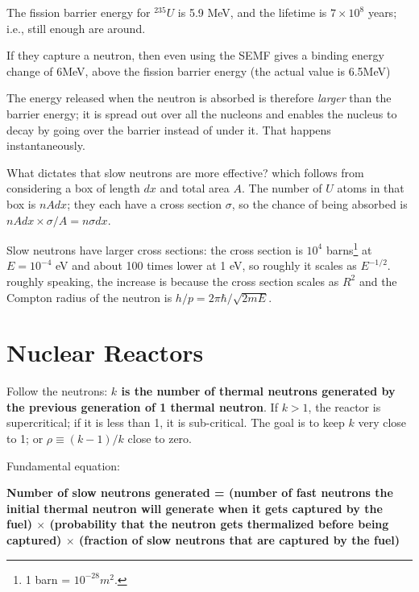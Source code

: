 \documentclass[11pt]{book}
\begin{document}
\bei
\item The fission barrier energy for $^{235}U$ is 5.9 MeV, and the lifetime is $7\times 10^8$ years; i.e., still enough are around.
\item If they capture a neutron, then even using the SEMF gives a binding energy change of 6MeV, above the fission barrier energy (the actual value is 6.5MeV)
\item The energy released when the neutron is absorbed is therefore {\it larger} than the barrier energy; it is spread out over all the nucleons and enables the nucleus to decay by going over the barrier instead of under it. That happens instantaneously.
\item What dictates that slow neutrons are more effective? which follows from considering a box of length $dx$ and total area $A$. The number of $U$ atoms in that box is $nAdx$; they each have a cross section $\sigma$, so the chance of being absorbed is $nAdx \times \sigma/A = n\sigma dx$. 
\item Slow neutrons have larger cross sections: the cross section is $10^4$ barns\footnote{1 barn = $10^{-28}m^2$.} at $E=10^{-4}$ eV and about 100 times lower at 1 eV, so roughly it scales as $E^{-1/2}$. roughly speaking, the increase is because the cross section scales as $R^2$ and the Compton radius of the neutron is $h/p=2\pi\hbar/\sqrt{2mE}$.
\eei


\section{Nuclear Reactors}



Follow the neutrons: {\bf $k$ is the number of thermal neutrons generated by the previous generation of 1 thermal neutron}. If $k>1$, the reactor is supercritical; if it is less than 1, it is sub-critical. The goal is to keep $k$ very close to 1; or $\rho\equiv (k-1)/k$ close to zero.

Fundamental equation:

{\bf Number of slow neutrons generated = (number of fast neutrons the initial thermal neutron will generate when it gets captured by the fuel) $\times$ (probability that the neutron gets thermalized before being captured) $\times$ (fraction of slow neutrons that are captured by the fuel)}
\end{document}
